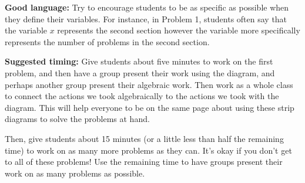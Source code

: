 \documentclass[nooutcomes,noauthor]{ximera}
\begin{document}
\begin{instructorNotes}
{\bf Good language:}  Try to encourage students to be as specific as possible when they define their variables. For instance, in Problem 1, students often say that the variable $x$ represents the second section however the variable more specifically represents the number of problems in the second section. 



{\bf Suggested timing:} Give students about five minutes to work on the first problem, and then have a group present their work using the diagram, and perhaps another group present their algebraic work. Then work as a whole class to connect the actions we took algebraically to the actions we took with the diagram. This will help everyone to be on the same page about using these strip diagrams to solve the problems at hand.

Then, give students about 15 minutes (or a little less than half the remaining time) to work on as many more problems as they can. It's okay if you don't get to all of these problems! Use the remaining time to have groups present their work on as many problems as possible.

\end{instructorNotes}
\end{document}
